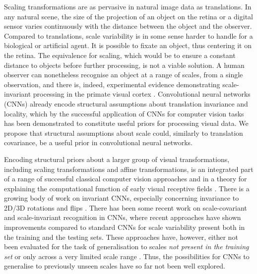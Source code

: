 \documentclass[twocolumn,runningheads]{svjour3}
\begin{document}
Scaling transformations are as pervasive in natural image data as
translations. In any natural scene, the size of the projection of an object on the
retina or a digital sensor varies continuously with the distance
between the object and the observer. 
Compared to translations, scale variability is in some sense harder to
handle for a biological or artificial agent. It is possible to fixate
an object, thus centering it on the retina. The equivalence for
scaling, which would be to ensure a constant distance to objects
before further processing, is not a viable solution. A human observer
can nonetheless recognise an object at a range of scales, from a
single observation, and there is, indeed, experimental evidence
demonstrating scale-invariant processing in the primate visual cortex
\cite{BieCoo92-ExpPhys,LogPauPog95-CurrBiol,ItoTamFujTan95-JNeuroPhys,FurEng00-VisRes,HunKrePogDiC05-Science,IsiMeyLeiPog13-JNPhys}.
Convolutional neural networks (CNNs) already encode structural
assumptions about translation invariance and locality, which by the
successful application of CNNs for computer vision tasks has been
demonstrated to constitute useful priors for processing visual data.
We propose that structural assumptions about scale could, similarly 
to translation covariance, be a useful prior in convolutional neural
networks. 

Encoding structural priors about a larger group of visual
transformations, including scaling transformations and affine
transformations, is an integrated part of a range of successful 
classical computer vision approaches
\cite{Lin97-IJCV,Lin98-IJCV,LG96-IVC,BL97-CVIU,ChoVerHalCro00-ECCV,Bau00-CVPR,MikSch04-IJCV,Low04-IJCV,BayEssTuyGoo08-CVIU,TuyMik08-Book,MorYu09-SIAM,Lin15-JMIV}
and in a theory for explaining the computational function of early visual
receptive fields \cite{Lin13-BICY,Lin21-Heliyon}.
There is a growing body of work on invariant CNNs, especially
concerning invariance to 2D/3D rotations and flips 
\cite{BruMal13-PAMI,WuHuKon15-arXiv,MarVolTui16-ICPR,CohWel16-ICML,DieFauKav16-ICML,LapSavBuhPol16-CVPR,WorGarTurBro17-CVPR,ZhoYeQiuJia17-CVPR,MarVolKomTui17-ICCV,CohWel17-ICLR,WeiGeiWelBooCoh18-NIPS,WeiHamSto18-CVPR,WorBro18-ECCV,CheHanZhoXu18-IP,CohGeiKoeWel18-ICLR,ThoSmiKeaYanLiKohRil18-arXiv}. 
There has been some recent work on scale-covariant and scale-invariant recognition in CNNs,
where recent approaches
\cite{XuXiaZhaYanZha14-arXiv,KanShaJac14-arXiv,MarKelLobTui18-arXiv,GhoGup19-arXiv,WorWel19-NeuroIPS}
have shown improvements compared to standard CNNs for scale
variability present both in the training and the testing sets. 
These approaches have, however, either not been evaluated for the 
task of generalisation to scales {\em not present in the training set\/} 
\cite{KanShaJac14-arXiv,EstAllZhoDan18-ICLR,MarKelLobTui18-arXiv,WorWel19-NeuroIPS} 
or only across a very limited scale range \cite{XuXiaZhaYanZha14-arXiv,GhoGup19-arXiv}. 
Thus, the possibilities for CNNs to generalise to previously unseen
scales have so far not been well explored. 
\end{document}
